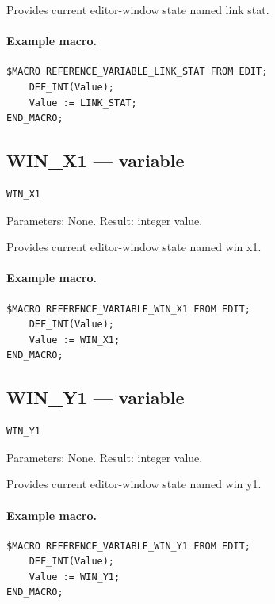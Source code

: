 \documentclass[a4paper,10pt,twoside,openany]{book}
\begin{document}
Provides current editor-window state named link stat.

\paragraph{Example macro.}
\begin{verbatim}
$MACRO REFERENCE_VARIABLE_LINK_STAT FROM EDIT;
    DEF_INT(Value);
    Value := LINK_STAT;
END_MACRO;
\end{verbatim}

\label{prim:variable-win-x1}
\subsection*{WIN\_X1 --- variable}
\begin{verbatim}
WIN_X1
\end{verbatim}
Parameters: None. Result: integer value.

Provides current editor-window state named win x1.

\paragraph{Example macro.}
\begin{verbatim}
$MACRO REFERENCE_VARIABLE_WIN_X1 FROM EDIT;
    DEF_INT(Value);
    Value := WIN_X1;
END_MACRO;
\end{verbatim}

\label{prim:variable-win-y1}
\subsection*{WIN\_Y1 --- variable}
\begin{verbatim}
WIN_Y1
\end{verbatim}
Parameters: None. Result: integer value.

Provides current editor-window state named win y1.

\paragraph{Example macro.}
\begin{verbatim}
$MACRO REFERENCE_VARIABLE_WIN_Y1 FROM EDIT;
    DEF_INT(Value);
    Value := WIN_Y1;
END_MACRO;
\end{verbatim}

\label{prim:variable-win-x2}
\end{document}
